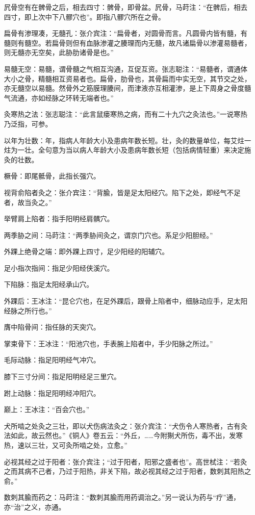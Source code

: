 \documentclass[12pt]{ctexbook}%
\begin{document}
\begin{jiaozhu}
  \item 凥骨空有在髀骨之后，相去四寸：髀骨，即骨盆。凥骨，马莳注：“在髀后，相去四寸，即上次中下八髎穴也”。即指八髎穴所在之骨。
  \item 扁骨有渗理凑，无髓孔：张介宾注：“扁骨者，对圆骨而言。凡圆骨内皆有髓，有髓则有髓空。若扁骨则但有血脉渗灌之腠理而内无髓，故凡诸扁骨以渗灌易髓者，则无髓亦无空矣，此胁肋诸骨是也。”
  \item 易髓无空：易髓，谓骨髓之气相互沟通，互促互资。张志聪注：“易髓者，谓通体大小之骨，精髓相互资易者也。扁骨，肋骨也，其骨扁而中实无空，其节交之处，亦无髓空以易髓。然骨外之筋膜理腠间，而津液亦互相灌渗，是上下周身之骨度髓气流通，亦如经脉之环转无端者也。”
  \item 灸寒热之法：张志聪注：“此言鼠瘘寒热之病，而有二十九穴之灸法也。”一说寒热乃泛指，可参。
  \item 以年为壮数：年，指病人年龄大小及患病年数长短。壮，灸的数量单位，每艾炷一炷为一壮。全句意为当以病人年龄大小及患病年数长短（包括病情轻重）来决定施灸的壮数。
  \item 橛骨：即尾骶骨，此指长强穴。
  \item 视背俞陷者灸之：张介宾注：“背腧，皆是足太阳经穴。陷下之处，即经气不足者，故当灸之。”
  \item 举臂肩上陷者：指手阳明经肩髃穴。
  \item 两季胁之间：马莳注：“两季胁间灸之，谓京门穴也。系足少阳胆经。”
  \item 外踝上绝骨之端：即外踝上四寸，足少阳经的阳辅穴。
  \item 足小指次指间：指足少阳经侠溪穴。
  \item 下陷脉：指足太阳经承山穴。
  \item 外踝后：王冰注：“昆仑穴也，在足外踝后，跟骨上陷者中，细脉动应手，足太阳经脉之所行也。”
  \item 膺中陷骨间：指任脉的天突穴。
  \item 掌束骨下：王冰注：“阳池穴也，手表腕上陷者中，手少阳脉之所过。”
  \item 毛际动脉：指足阳明经气冲穴。
  \item 膝下三寸分间：指足阳明经足三里穴。
  \item 跗上动脉：指足阳明经冲阳穴。
  \item 巅上：王冰注：“百会穴也。”
  \item 犬所啮之处灸之三壮，即以犬伤病法灸之：张介宾注：“犬伤令人寒热者，古有灸法如此，故云然也。”《铜人》卷五云：“外丘，……今附猘犬所伤，毒不出，发寒热，速以三壮，又可灸所啮之处，立愈。”
  \item 必视其经之过于阳者：张介宾注；“过于阳者，阳邪之盛者也”。高世栻注：“若灸之而其病不己者，乃过于阳热，非关下陷，故必视其经之过于阳者，数刺其阳热之俞。”
  \item 数刺其腧而药之：马莳注：“数刺其腧而用药调治之。”另一说认为药与“疗”通，亦“治”之义，亦通。
\end{jiaozhu}
\end{document}
